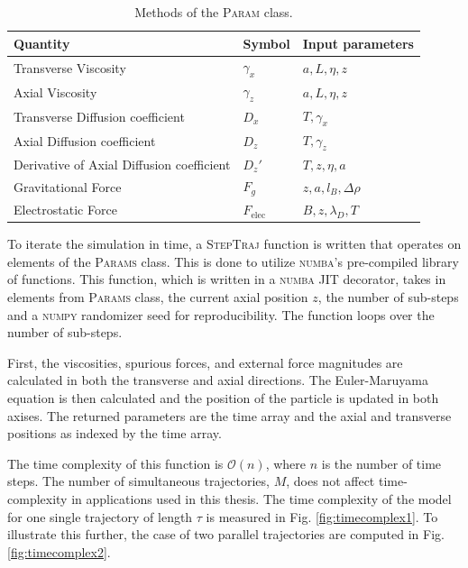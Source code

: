 \begin{table}[h!]
    \centering
    \begin{tabularx}{0.8\textwidth}{@{}Xll@{}}
        \toprule
        \textbf{Quantity} & \textbf{Symbol} & \textbf{Input parameters}\\
        \midrule
        Transverse Viscosity & $\gamma_x$& $a, L, \eta, z$ \\
        Axial Viscosity & $\gamma_z$& $a, L, \eta, z$ \\
        Transverse Diffusion coefficient & $D_x$& $T, \gamma_x$  \\
        Axial Diffusion coefficient & $D_z$& $T, \gamma_z$ \\
        Derivative of Axial Diffusion coefficient & $D_z'$ & $T, z, \eta, a$\\
        Gravitational Force & $F_g$ & $z, a, l_B, \Delta \rho$ \\
        Electrostatic Force & $F_\mathrm{elec}$ & $B, z, \lambda_D, T$ \\ 
        \bottomrule
    \end{tabularx}
    \caption{Methods of the \textsc{Param} class.}
    \label{tab:sim_params}
\end{table}

To iterate the simulation in time, a \textsc{StepTraj} function is written that operates on elements of the \textsc{Params} class. This is done to utilize \textsc{numba}'s pre-compiled library of functions. This function, which is written in a \textsc{numba} JIT decorator, takes in elements from \textsc{Params} class, the current axial position $z$, the number of sub-steps and a \textsc{numpy} randomizer seed for reproducibility. The function loops over the number of sub-steps. 

First, the viscosities, spurious forces, and external force magnitudes are calculated in both the transverse and axial directions. The Euler-Maruyama equation is then calculated and the position of the particle is updated in both axises. The returned parameters are the time array and the axial and transverse positions as indexed by the time array.

The time complexity of this function is $\mathcal{O}(n)$, where $n$ is the number of time steps. The number of simultaneous trajectories, $M$, does not affect time-complexity in applications used in this thesis. The time complexity of the model for one single trajectory of length $\tau$ is measured in Fig. \ref{fig:timecomplex1}. To illustrate this further, the case of two parallel trajectories are computed in Fig. \ref{fig:timecomplex2}.

